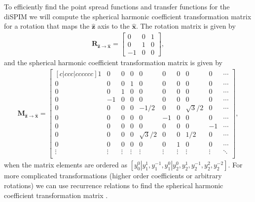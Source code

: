 \documentclass[11pt]{article}
\providecommand{\mb}[1]{\mathbf{#1}}
\providecommand{\mh}[1]{\mathbf{\hat{#1}}}
\begin{document}
To efficiently find the point spread functions and transfer functions for the
diSPIM we will compute the spherical harmonic coefficient transformation matrix
for a rotation that maps the $\mh{z}$ axis to the $\mh{x}$. The rotation matrix is
given by
\begin{align}
  \mb{R}_{\mh{z}\rightarrow\mh{x}} =
  \begin{bmatrix}
    0&0&1\\
    0&1&0\\
    -1&0&0    
  \end{bmatrix}, 
\end{align}
and the spherical harmonic coefficient transformation matrix is given by
\begin{align}
  \mathbf{M}_{\mh{z}\rightarrow\mh{x}} =
  \begin{bmatrix}[c|ccc|cccccc]
    1&0&0&0&0&0&0&0&0&\cdots\\ \hline 
    0&0&0&1&0&0&0&0&0&\cdots\\
    0&0&1&0&0&0&0&0&0&\cdots\\
    0&-1&0&0&0&0&0&0&0&\cdots\\ \hline 
    0&0&0&0&-1/2&0&0&\sqrt{3}/2&0&\cdots\\
    0&0&0&0&0&-1&0&0&0&\cdots\\
    0&0&0&0&0&0&0&0&-1&\cdots\\
    0&0&0&0&\sqrt{3}/{2}&0&0&1/2&0&\cdots\\
    0&0&0&0&0&0&1&0&0&\cdots\\    
    \vdots&\vdots&\vdots&\vdots&\vdots&\vdots&\vdots&\vdots&\vdots&\ddots\\        
  \end{bmatrix},
\end{align}
when the matrix elements are ordered as
$[y_0^0 | y_1^1, y_1^{-1}, y_1^0 | y_2^0, y_2^1, y_2^{-1}, y_2^2, y_2^{-2}]$.
For more complicated transformations (higher order coefficients or arbitrary
rotations) we can use recurrence relations to find the spherical harmonic
coefficient transformation matrix \cite{ivanic1996}.

{}

\end{document}
